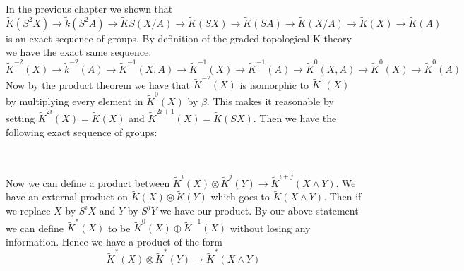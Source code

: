\documentclass[../Thesis.tex]{subfiles}
\begin{document}
In the previous chapter we shown that 
\begin{equation}
\tilde{K}(S^2X) \rightarrow \tilde{k}(S^2A) \rightarrow \tilde{K} S(X/A) \rightarrow \tilde{K}(SX) \rightarrow \tilde{K}(SA) \rightarrow \tilde{K}(X/A) \rightarrow \tilde{K}(X) \rightarrow \tilde{K}(A)
 \end{equation}
is an exact sequence of groups. By definition of the graded topological K-theory we have the exact same sequence:
\begin{equation}
\tilde{K}^{-2}(X) \rightarrow \tilde{k}^{-2}(A) \rightarrow \tilde{K}^{-1} (X,A) \rightarrow \tilde{K}^{-1}(X) \rightarrow \tilde{K}^{-1}(A) \rightarrow \tilde{K}^0(X,A) \rightarrow \tilde{K}^0(X) \rightarrow \tilde{K}^0(A)
 \end{equation}
Now by the product theorem we have that $\tilde{K}^{-2}(X)$ is isomorphic to $\tilde{K}^0(X)$ by multiplying every element in $\tilde{K}^0(X)$ by $\beta$. This makes it reasonable by setting $\tilde{K}^{2i}(X) = \tilde{K}(X)$ and $\tilde{K}^{2i +1}(X) = \tilde{K}(SX)$. Then we have the following exact sequence of groups:
\begin{center}
 \\    
\end{center}
Now we can define a product between $\tilde{K}^{i}(X) \otimes \tilde{K}^{j}(Y) \rightarrow \tilde{K}^{i + j}(X \wedge Y)$. We have an external product on $\tilde{K}(X) \otimes \tilde{K}(Y)$ which goes to $\tilde{K}(X \wedge Y)$. Then if we replace $X$ by $S^iX$ and $Y$ by $S^jY$ we have our product. By our above statement  we can define $\tilde{K}^*(X)$ to be $\tilde{K}^0(X) \oplus \tilde{K}^{-1}(X)$ without losing any information. Hence we have a product of the form
$$\tilde{K}^*(X) \otimes \tilde{K}^*(Y) \rightarrow \tilde{K}^*(X \wedge Y)$$
\end{document}
